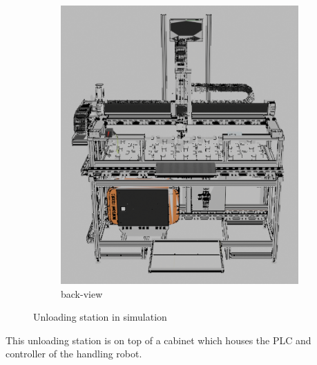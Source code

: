 \begin{figure}[h]
\begin{subfigure}{0.45\textwidth}
        \includegraphics[width=\textwidth]{figures/unloading-station-back-blender.png} %
        \caption{back-view}
        \label{fig:unloading-station-back}
    \end{subfigure}
    \caption{Unloading station in simulation}
    \label{fig:unloading-station}
\end{figure}

This unloading station is on top of a cabinet which houses the PLC and controller of the handling robot.
